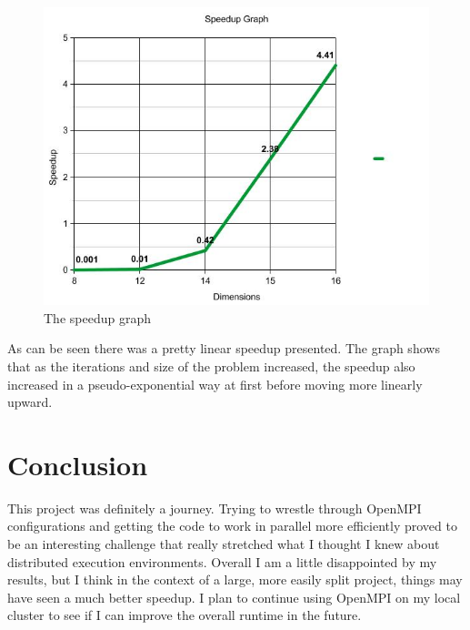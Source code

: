 \documentclass[11pt]{article}
\begin{document}
\begin{figure}[h!]
  \includegraphics[width=\linewidth]{graph.jpg}
  \caption{The speedup graph}
\end{figure}

As can be seen there was a pretty linear speedup presented. The graph shows that as the iterations and size of the problem increased, the speedup also increased in a pseudo-exponential way at first before
moving more linearly upward.

\section{Conclusion}
This project was definitely a journey. Trying to wrestle through OpenMPI configurations and getting the code to work in parallel more efficiently proved to be an interesting challenge that really
stretched what I thought I knew about distributed execution environments. Overall I am a little disappointed by my results, but I think in the context of a large, more easily split project, things
may have seen a much better speedup. I plan to continue using OpenMPI on my local cluster to see if I can improve the overall runtime in the future.
\end{document}
